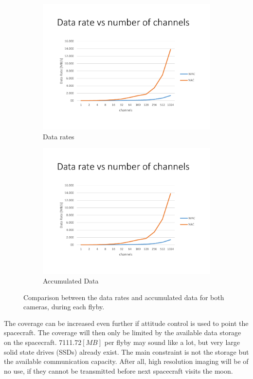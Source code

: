 \begin{figure}[h!]
    \centering
    \begin{subfigure}[b]{0.48\textwidth}
        \includegraphics[width=\textwidth,page=4,trim=15mm 15mm 15mm 32mm,clip]{figures/Orbiter/Graphs_excel.pdf}
        \caption{Data rates}\label{fig:data_gen_wac_compare}
    \end{subfigure}
    \begin{subfigure}[b]{0.48\textwidth}
        \includegraphics[width=\textwidth,page=5,trim=15mm 15mm 15mm 32mm,clip]{figures/Orbiter/Graphs_excel.pdf}
        \caption{Accumulated Data}\label{fig:data_gen_nac_compare}
    \end{subfigure}
    \caption{Comparison between the data rates and accumulated data for both cameras, during each flyby.}\label{fig:data_gen_wac_nac_compare1}
\end{figure}
The coverage can be increased even further if attitude control is used to point the spacecraft. The coverage will then only be limited by the available data storage on the spacecraft. 7111.72$[MB]$ per flyby may sound like a lot, but very large solid state drives (SSDs) already exist. The main constraint is not the storage but the available communication capacity. After all, high resolution imaging will be of no use, if they cannot be transmitted before next spacecraft visits the moon. 

